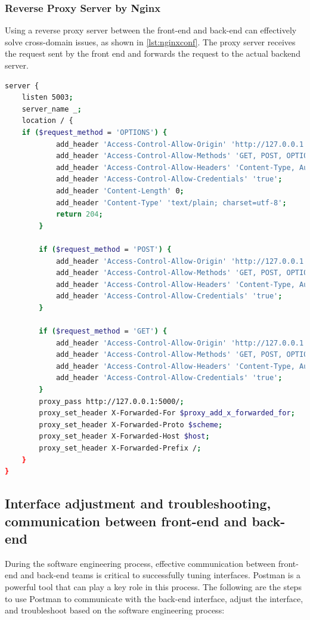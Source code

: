 \documentclass[journal]{IEEEtran}
\begin{document}
\subsubsection{Reverse Proxy Server by Nginx}
Using a reverse proxy server between the front-end and back-end can effectively solve cross-domain issues, as shown in \ref{lst:nginxconf}. The proxy server receives the request sent by the front end and forwards the request to the actual backend server.

\begin{lstlisting}[caption={Nginx Configuration},label={lst:nginxconf},language=bash,breaklines=true]
server {
    listen 5003;
    server_name _;
    location / {
	if ($request_method = 'OPTIONS') {
            add_header 'Access-Control-Allow-Origin' 'http://127.0.0.1:3000';
            add_header 'Access-Control-Allow-Methods' 'GET, POST, OPTIONS';
            add_header 'Access-Control-Allow-Headers' 'Content-Type, Authorization';
            add_header 'Access-Control-Allow-Credentials' 'true';
            add_header 'Content-Length' 0;
            add_header 'Content-Type' 'text/plain; charset=utf-8';
            return 204;
        }

        if ($request_method = 'POST') {
            add_header 'Access-Control-Allow-Origin' 'http://127.0.0.1:3000';
            add_header 'Access-Control-Allow-Methods' 'GET, POST, OPTIONS';
            add_header 'Access-Control-Allow-Headers' 'Content-Type, Authorization';
            add_header 'Access-Control-Allow-Credentials' 'true';
        }

        if ($request_method = 'GET') {
            add_header 'Access-Control-Allow-Origin' 'http://127.0.0.1:3000';
            add_header 'Access-Control-Allow-Methods' 'GET, POST, OPTIONS';
            add_header 'Access-Control-Allow-Headers' 'Content-Type, Authorization';
            add_header 'Access-Control-Allow-Credentials' 'true';
        }
        proxy_pass http://127.0.0.1:5000/;
        proxy_set_header X-Forwarded-For $proxy_add_x_forwarded_for;
        proxy_set_header X-Forwarded-Proto $scheme;
        proxy_set_header X-Forwarded-Host $host;
        proxy_set_header X-Forwarded-Prefix /;
    }
}
\end{lstlisting}

\subsection{Interface adjustment and troubleshooting, communication between front-end and back-end}
During the software engineering process, effective communication between front-end and back-end teams is critical to successfully tuning interfaces. Postman is a powerful tool that can play a key role in this process. The following are the steps to use Postman to communicate with the back-end interface, adjust the interface, and troubleshoot based on the software engineering process:
\end{document}

